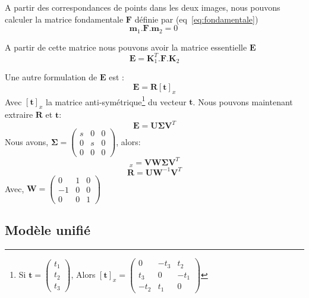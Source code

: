 A partir des correspondances de points dans les deux images, nous pouvons calculer la matrice fondamentale $\mathbf{F}$ définie par (eq~\ref{eq:fondamentale})
\begin{equation}
\mathbf{m}_1.\mathbf{F}.\mathbf{m}_2 = 0
\
\label{eq:fondamentale}
\end{equation}

A partir de cette matrice nous pouvons avoir la matrice essentielle $\mathbf{E}$
\begin{equation}
\mathbf{E} = \mathbf{K}_1^{T} . \mathbf{F} . \mathbf{K}_2
\end{equation}

Une autre formulation de $\mathbf{E}$ est :
\begin{equation}
\mathbf{E} = \mathbf{R} [\mathbf{t}]_x
\end{equation}
Avec $[\mathbf{t}]_x$ la matrice anti-symétrique\footnote{Si $\mathbf{t}=\begin{pmatrix}t_1\\t_2\\t_3\end{pmatrix}$, Alors $[\mathbf{t}]_x=\begin{pmatrix}0&-t_3&t_2\\t_3&0&-t_1\\-t_2&t_1&0\end{pmatrix}$} du vecteur $\mathbf{t}$.
Nous pouvons maintenant extraire $\mathbf{R}$ et $\mathbf{t}$:
$$\mathbf{E}=\mathbf{U} \mathbf{\Sigma} \mathbf{V}^T$$
Nous avons, $ \mathbf{\Sigma} = \begin{pmatrix}s&0&0\\0&s&0\\0&0&0\end{pmatrix}$, alors:
\begin{equation}
[\mathbf{t}]_x = \mathbf{V} \mathbf{W} \mathbf{\Sigma} \mathbf{V}^T
\end{equation}
\begin{equation}
\mathbf{R} = \mathbf{U} \mathbf{W}^{-1} \mathbf{V}^T
\end{equation}
Avec, $\mathbf{W}=\begin{pmatrix}0&1&0\\-1&0&0\\0&0&1\end{pmatrix}$




\subsection{Modèle unifié}

